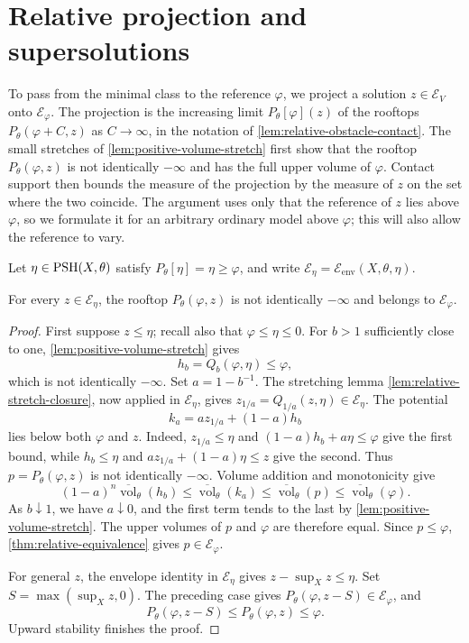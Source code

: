 \section{Relative projection and supersolutions}
\label{sec:big-relative-projection}

To pass from the minimal class to the reference $\varphi$, we project a solution $z\in\mathcal E_V$ onto $\mathcal E_\varphi$. The projection is the increasing limit $P_\theta[\varphi](z)$ of the rooftops $P_\theta(\varphi+C,z)$ as $C\to\infty$, in the notation of \cref{lem:relative-obstacle-contact}. The small stretches of \cref{lem:positive-volume-stretch} first show that the rooftop $P_\theta(\varphi,z)$ is not identically $-\infty$ and has the full upper volume of $\varphi$. Contact support then bounds the measure of the projection by the measure of $z$ on the set where the two coincide. The argument uses only that the reference of $z$ lies above $\varphi$, so we formulate it for an arbitrary ordinary model above $\varphi$; this will also allow the reference to vary.

Let $\eta\in\mathrm{PSH}(X,\theta)$ satisfy $P_\theta[\eta]=\eta\geq\varphi$, and write $\mathcal E_\eta=\mathcal E_{\mathrm{env}}(X,\theta,\eta)$.

\begin{proposition}\label{prop:big-cross-class-roof}
For every $z\in\mathcal E_\eta$, the rooftop $P_\theta(\varphi,z)$ is not identically $-\infty$ and belongs to $\mathcal E_\varphi$.
\end{proposition}
\begin{proof}
First suppose $z\leq\eta$; recall also that $\varphi\leq\eta\leq0$. For $b>1$ sufficiently close to one, \cref{lem:positive-volume-stretch} gives
\[
 h_b=Q_b(\varphi,\eta)\leq\varphi,
\]
which is not identically $-\infty$. Set $a=1-b^{-1}$. The stretching lemma \cref{lem:relative-stretch-closure}, now applied in $\mathcal E_\eta$, gives $z_{1/a}=Q_{1/a}(z,\eta)\in\mathcal E_\eta$. The potential
\[
 k_a=a z_{1/a}+(1-a)h_b
\]
lies below both $\varphi$ and $z$. Indeed, $z_{1/a}\leq\eta$ and $(1-a)h_b+a\eta\leq\varphi$ give the first bound, while $h_b\leq\eta$ and $a z_{1/a}+(1-a)\eta\leq z$ give the second. Thus $p=P_\theta(\varphi,z)$ is not identically $-\infty$. Volume addition and monotonicity give
\[
 (1-a)^n\overline{\operatorname{vol}}_\theta(h_b)
 \leq\overline{\operatorname{vol}}_\theta(k_a)
 \leq\overline{\operatorname{vol}}_\theta(p)
 \leq\overline{\operatorname{vol}}_\theta(\varphi).
\]
As $b\downarrow1$, we have $a\downarrow0$, and the first term tends to the last by \cref{lem:positive-volume-stretch}. The upper volumes of $p$ and $\varphi$ are therefore equal. Since $p\leq\varphi$, \cref{thm:relative-equivalence} gives $p\in\mathcal E_\varphi$.

For general $z$, the envelope identity in $\mathcal E_\eta$ gives $z-\sup_Xz\leq\eta$. Set $S=\max(\sup_Xz,0)$. The preceding case gives $P_\theta(\varphi,z-S)\in\mathcal E_\varphi$, and
\[
 P_\theta(\varphi,z-S)\leq P_\theta(\varphi,z)\leq\varphi.
\]
Upward stability finishes the proof.
\end{proof}

